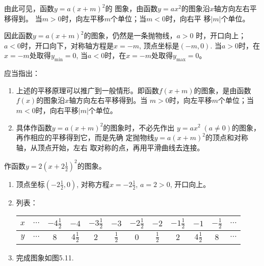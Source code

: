 由此可见，函数$y=a(x+m)^2$的
图象，由函数$y=ax^2$的图象沿$x$轴方向左右平移得到。
当$m>0$时，向左平移$m$个单位；当$m<0$时，向右平
移$|m|$个单位。

因此函数$y=a(x+m)^2$的图象，仍然是一条抛物线，$a>0$
时，开口向上；$a<0$时，开口向下，对称轴方程是$x=-m$,
顶点坐标是$(-m,0)$. 当$a>0$时，在$x=-m$处取得$y_{\min}=0$, 当$a<0$时，在$x=-m$处取得$y_{\max}=0$。

应当指出：
\begin{enumerate}
    \item 上述的平移原理可以推广到一般情形。即函数$f(x+m)$的图象，是由函数$f(x)$的图象沿$x$轴方向左右平移得到。当
    $m>0$时，向左平移$m$个单位；当$m<0$时，向右平移$|m|$个单位。
    \item 具体作函数$y=a(x+m)^2$的图象时，不必先作出
    $y=ax^2\; (a\ne 0)$的图象，再作相应的平移得到它，而是先确
    定抛物线$y=a(x+m)^2$的顶点和对称轴，从顶点开始，左右
    取对称的点，再用平滑曲线去连接。
\end{enumerate}

\begin{example}
    作函数$y=2\left(x+2\frac{1}{2}\right)^2$的图象。
\end{example}

\begin{solution}
\begin{enumerate}
    \item 顶点坐标$\left(-2\frac{1}{2},0\right)$, 对称方程$x=-2\frac{1}{2}$,
    $a=2>0$, 开口向上。
    \item 列表：
\begin{center}
\begin{tabular}{c|ccccccccccc}
\hline
$x$&$\cdots$& $-4\tfrac{1}{2}$ &  $-4$ &  $-3\tfrac{1}{2}$ &  $-3$ &  $-2\tfrac{1}{2}$ &  $-2$ &  $-1\tfrac{1}{2}$ &  $-1$ &  $-\tfrac{1}{2}$ &$\cdots$\\
\hline
$y$&$\cdots$ & $8$& $4\tfrac{1}{2}$ &  $2$ &  $\tfrac{1}{2}$ &  $0$ &  $\tfrac{1}{2}$ &  $2$ &  $4\tfrac{1}{2}$ &  $8$ &  $\cdots$ \\
\hline
\end{tabular}
\end{center}

\item 完成图象如图5.11.
\end{enumerate}      

\begin{figure}[htp]
    \centering
{}
    \caption{}
\end{figure}
\end{solution}


